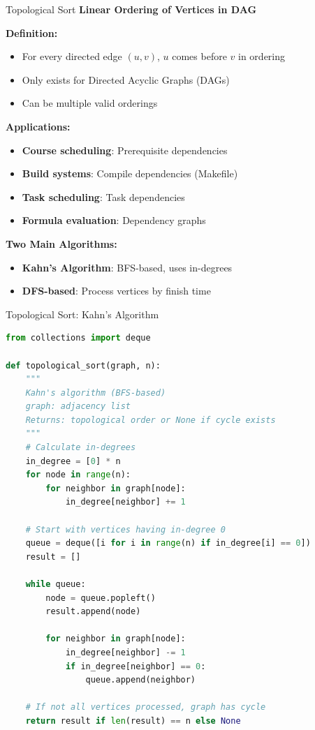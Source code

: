 \documentclass[aspectratio=169]{beamer}
\begin{document}
\begin{frame}{Topological Sort}
  \textbf{Linear Ordering of Vertices in DAG}

  \vspace{0.3cm}
  \textbf{Definition:}
  \begin{itemize}
    \item For every directed edge $(u, v)$, $u$ comes before $v$ in ordering
    \item Only exists for Directed Acyclic Graphs (DAGs)
    \item Can be multiple valid orderings
  \end{itemize}

  \vspace{0.3cm}
  \textbf{Applications:}
  \begin{itemize}
    \item \textbf{Course scheduling}: Prerequisite dependencies
    \item \textbf{Build systems}: Compile dependencies (Makefile)
    \item \textbf{Task scheduling}: Task dependencies
    \item \textbf{Formula evaluation}: Dependency graphs
  \end{itemize}

  \vspace{0.3cm}
  \textbf{Two Main Algorithms:}
  \begin{itemize}
    \item \textbf{Kahn's Algorithm}: BFS-based, uses in-degrees
    \item \textbf{DFS-based}: Process vertices by finish time
  \end{itemize}
\end{frame}

\begin{frame}[fragile]{Topological Sort: Kahn's Algorithm}
\begin{lstlisting}[language=Python, basicstyle=\ttfamily\tiny]
from collections import deque

def topological_sort(graph, n):
    """
    Kahn's algorithm (BFS-based)
    graph: adjacency list
    Returns: topological order or None if cycle exists
    """
    # Calculate in-degrees
    in_degree = [0] * n
    for node in range(n):
        for neighbor in graph[node]:
            in_degree[neighbor] += 1

    # Start with vertices having in-degree 0
    queue = deque([i for i in range(n) if in_degree[i] == 0])
    result = []

    while queue:
        node = queue.popleft()
        result.append(node)

        for neighbor in graph[node]:
            in_degree[neighbor] -= 1
            if in_degree[neighbor] == 0:
                queue.append(neighbor)

    # If not all vertices processed, graph has cycle
    return result if len(result) == n else None
\end{lstlisting}
\end{frame}
\end{document}
